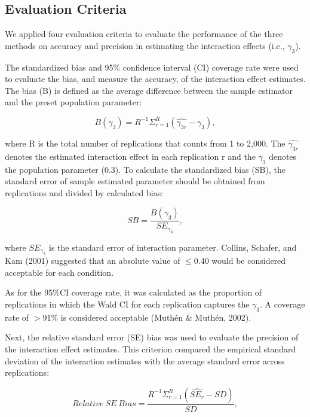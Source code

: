 \documentclass[
  man]{apa7}
\begin{document}
\hypertarget{evaluation-criteria}{%
\subsection{Evaluation Criteria}\label{evaluation-criteria}}

We applied four evaluation criteria to evaluate the performance of the three methods on accuracy and precision in estimating the interaction effects (i.e., \(\gamma_{3}\)).

The standardized bias and 95\(\%\) confidence interval (CI) coverage rate were used to evaluate the bias, and measure the accuracy, of the interaction effect estimates. The bias (B) is defined as the average difference between the sample estimator and the preset population parameter:

\begin{equation}
B(\gamma_{3}) = R^{-1}\Sigma^{R}_{r = 1}(\hat{\gamma_{3r}} - \gamma_{3}),
\end{equation}

where R is the total number of replications that counts from 1 to 2,000. The \(\hat{\gamma_{3r}}\) denotes the estimated interaction effect in each replication r and the \(\gamma_{3}\) denotes the population parameter (0.3). To calculate the standardized bias (SB), the standard error of sample estimated parameter should be obtained from replications and divided by calculated bias:

\begin{equation}
SB = \frac{B(\gamma_{3})}{SE_{\gamma_{3}}},
\end{equation}

where \(SE_{\gamma_{3}}\) is the standard error of interaction parameter. Collins, Schafer, and Kam (2001) suggested that an absolute value of \(\le 0.40\) would be considered acceptable for each condition.

As for the 95\(\%\)CI coverage rate, it was calculated as the proportion of replications in which the Wald CI for each replication captures the \(\gamma_{3}\). A coverage rate of \(> 91\%\) is considered acceptable (Muthén \(\&\) Muthén, 2002).

Next, the relative standard error (SE) bias was used to evaluate the precision of the interaction effect estimates. This criterion compared the empirical standard deviation of the interaction estimates with the average standard error across replications:

\begin{equation}
Relative\ SE\ Bias = \frac{R^{-1}\Sigma^{R}_{r = 1}(\widehat{SE_{r}} - SD)}{SD},
\end{equation}
\end{document}
